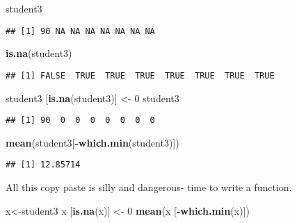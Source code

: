 \documentclass[
]{article}
\newenvironment{Shaded}{\begin{snugshade}}{\end{snugshade}}
\newcommand{\DecValTok}[1]{\textcolor[rgb]{0.00,0.00,0.81}{#1}}
\newcommand{\KeywordTok}[1]{\textcolor[rgb]{0.13,0.29,0.53}{\textbf{#1}}}
\newcommand{\NormalTok}[1]{#1}
\newcommand{\OperatorTok}[1]{\textcolor[rgb]{0.81,0.36,0.00}{\textbf{#1}}}
\newcommand{\StringTok}[1]{\textcolor[rgb]{0.31,0.60,0.02}{#1}}
\begin{document}
\begin{Shaded}
\begin{Highlighting}[]
\NormalTok{student3}
\end{Highlighting}
\end{Shaded}

\begin{verbatim}
## [1] 90 NA NA NA NA NA NA NA
\end{verbatim}

\begin{Shaded}
\begin{Highlighting}[]
\KeywordTok{is.na}\NormalTok{(student3)}
\end{Highlighting}
\end{Shaded}

\begin{verbatim}
## [1] FALSE  TRUE  TRUE  TRUE  TRUE  TRUE  TRUE  TRUE
\end{verbatim}

\begin{Shaded}
\begin{Highlighting}[]
\NormalTok{student3 [}\KeywordTok{is.na}\NormalTok{(student3)] <-}\StringTok{ }\DecValTok{0}
\NormalTok{student3}
\end{Highlighting}
\end{Shaded}

\begin{verbatim}
## [1] 90  0  0  0  0  0  0  0
\end{verbatim}

\begin{Shaded}
\begin{Highlighting}[]
\KeywordTok{mean}\NormalTok{(student3[}\OperatorTok{-}\KeywordTok{which.min}\NormalTok{(student3)])}
\end{Highlighting}
\end{Shaded}

\begin{verbatim}
## [1] 12.85714
\end{verbatim}

All this copy paste is silly and dangerous- time to write a function.

\begin{Shaded}
\begin{Highlighting}[]
\NormalTok{x<-student3}
\NormalTok{x [}\KeywordTok{is.na}\NormalTok{(x)] <-}\StringTok{ }\DecValTok{0}
\KeywordTok{mean}\NormalTok{(x [}\OperatorTok{-}\KeywordTok{which.min}\NormalTok{(x)])}
\end{Highlighting}
\end{Shaded}
\end{document}
